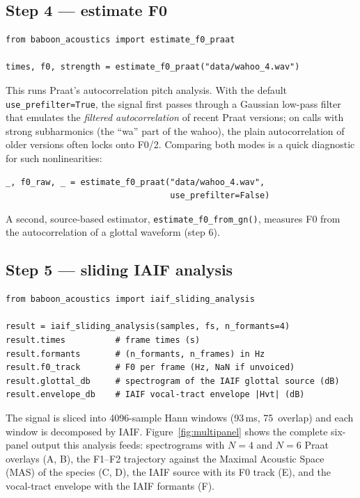 \documentclass[11pt,a4paper]{article}
\begin{document}
\subsection{Step 4 --- estimate F0}

\begin{lstlisting}
from baboon_acoustics import estimate_f0_praat

times, f0, strength = estimate_f0_praat("data/wahoo_4.wav")
\end{lstlisting}

This runs Praat's autocorrelation pitch analysis. With the default
\texttt{use\_prefilter=True}, the signal first passes through a
Gaussian low-pass filter that emulates the \emph{filtered
autocorrelation} of recent Praat versions; on calls with strong
subharmonics (the ``wa'' part of the wahoo), the plain autocorrelation
of older versions often locks onto F0/2. Comparing both modes is a
quick diagnostic for such nonlinearities:

\begin{lstlisting}
_, f0_raw, _ = estimate_f0_praat("data/wahoo_4.wav",
                                 use_prefilter=False)
\end{lstlisting}

A second, source-based estimator, \texttt{estimate\_f0\_from\_gn()},
measures F0 from the autocorrelation of a glottal waveform (step 6).

\subsection{Step 5 --- sliding IAIF analysis}

\begin{lstlisting}
from baboon_acoustics import iaif_sliding_analysis

result = iaif_sliding_analysis(samples, fs, n_formants=4)
result.times          # frame times (s)
result.formants       # (n_formants, n_frames) in Hz
result.f0_track       # F0 per frame (Hz, NaN if unvoiced)
result.glottal_db     # spectrogram of the IAIF glottal source (dB)
result.envelope_db    # IAIF vocal-tract envelope |Hvt| (dB)
\end{lstlisting}

The signal is sliced into 4096-sample Hann windows (93\,ms, 75\,%
overlap) and each window is decomposed by IAIF.
Figure~\ref{fig:multipanel} shows the complete six-panel output this
analysis feeds: spectrograms with $N{=}4$ and $N{=}6$ Praat overlays
(A, B), the F1--F2 trajectory against the Maximal Acoustic Space (MAS)
of the species (C, D), the IAIF source with its F0 track (E), and the
vocal-tract envelope with the IAIF formants (F).
\end{document}
